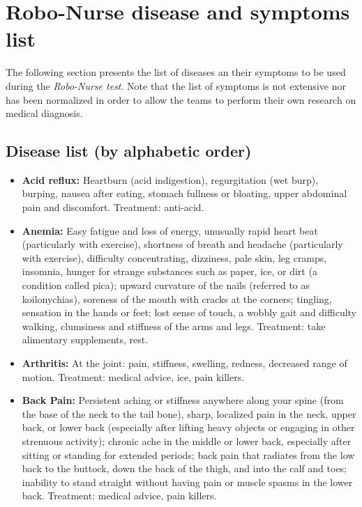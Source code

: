 \section{Robo-Nurse disease and symptoms list}

The following section presents the list of diseases an their symptoms to be used during the \textit{Robo-Nurse test}. Note that the list of symptoms is not extensive nor has been normalized in order to allow the teams to perform their own research on medical diagnosis.

\subsection{Disease list (by alphabetic order)}

\begin{itemize}

\item \textbf{Acid reflux:} Heartburn (acid indigestion), regurgitation (wet burp), burping, nausea after eating, stomach fullness or bloating, upper abdominal pain and discomfort. Treatment:  anti-acid.

\item \textbf{Anemia:} Easy fatigue and loss of energy, unusually rapid heart beat (particularly with exercise), shortness of breath and headache (particularly with exercise), difficulty concentrating, dizziness, pale skin, leg cramps, insomnia, hunger for strange substances such as paper, ice, or dirt (a condition called pica); upward curvature of the nails (referred to as koilonychias), soreness of the mouth with cracks at the corners; tingling,  sensation in the hands or feet; lost sense of touch, a wobbly gait and difficulty walking, clumsiness and stiffness of the arms and legs. Treatment: take alimentary supplements, rest.

\item \textbf{Arthritis:} At the joint: pain, stiffness, swelling, redness, decreased range of motion. Treatment: medical advice, ice, pain killers.

\item \textbf{Back Pain:} Persistent aching or stiffness anywhere along your spine (from the base of the neck to the tail bone), sharp, localized pain in the neck, upper back, or lower back (especially after lifting heavy objects or engaging in other strenuous activity); chronic ache in the middle or lower back, especially after sitting or standing for extended periods; back pain that radiates from the low back to the buttock, down the back of the thigh, and into the calf and toes; inability to stand straight without having pain or muscle spasms in the lower back. Treatment: medical advice, pain killers.


\end{itemize}
